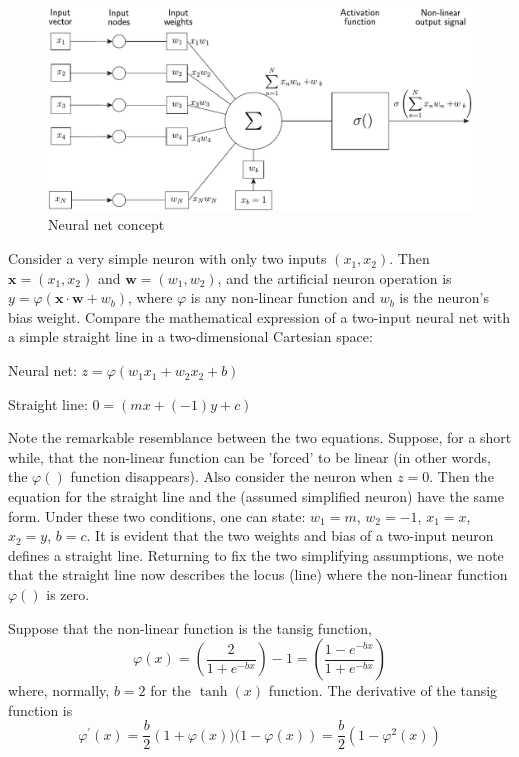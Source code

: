 \begin{figure}[tb]
\centering
\includegraphics[width=\textwidth]{eps/neuralnetconcept}
\caption{Neural net concept\label{fig:neuralnetconcept}}
\end{figure}

Consider a very simple neuron with only two inputs $(x_1,x_2)$.  Then $\bm{x}=(x_1,x_2)$  and  $\bm{w}=(w_1,w_2)$, and the artificial neuron operation is $y = \varphi(\bm{x}\cdot\bm{w}+w_b)$, where $\varphi$  is any non-linear function and  $w_b$ is the neuron's bias weight.  Compare the mathematical expression of a two-input neural net with a simple straight line in a two-dimensional Cartesian space:

Neural net: $z=\varphi(w_1x_1+w_2x_2+b)$

Straight line:  $0=(mx+(-1)y+c)$

Note the remarkable resemblance between the two equations.  Suppose, for a short while, that the non-linear function can be 'forced' to be linear (in other words, the $\varphi()$ function   disappears).  Also consider the neuron when $z=0$.  Then the equation for the straight line and the (assumed simplified neuron) have the same form.  Under these two conditions, one can state: $w_1=m$, $w_2=-1$, $x_1=x$, $x_2=y$, $b=c$.  It is evident that the two weights and bias of a two-input neuron defines a straight line.  Returning to fix the two simplifying assumptions, we note that the straight line now describes the locus (line) where the non-linear function $\varphi()$ is zero.  

Suppose that the non-linear function is the tansig function\cite{stackexchangeEllefsen2015,WikiPediaHyperbolicfunction2019,NickBecker2017}, 
\begin{equation}
\varphi(x)
=\left(\frac{2}{1+e^{-bx}}\right)-1
=\left(\frac{1-e^{-bx}}{1+e^{-bx}}\right)
\end{equation}  
where, normally, $b=2$ for the $\tanh(x)$ function.
The derivative of the tansig function is 
\begin{equation}
 \varphi^\prime(x)
 = \frac{b}{2} \left(1+\varphi(x))(1-\varphi(x)\right)
 = \frac{b}{2}\left(1-\varphi^2(x)\right)
\end{equation}



